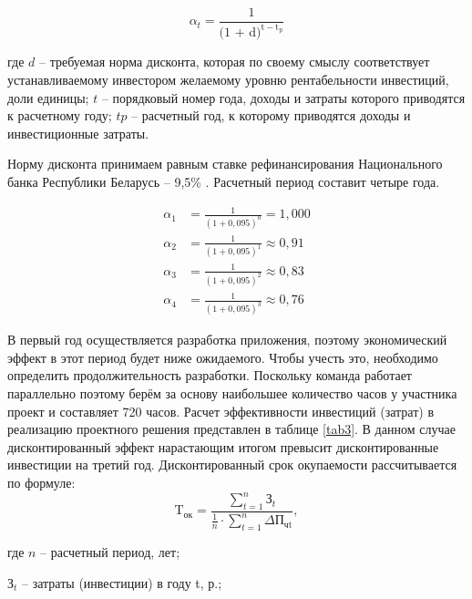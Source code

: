 \begin{equation}
\alpha_t = \frac{1}{\text{(1 + d)}^{\text{t}-\text{t}_\text{p}}}
\end{equation}
\newpage

где $d$ – требуемая норма дисконта, которая по своему смыслу соответствует устанавливаемому инвестором желаемому уровню рентабельности инвестиций, доли единицы;
$t$  – порядковый номер года, доходы и затраты которого приводятся к расчетному году;
$tp$  – расчетный год, к которому приводятся доходы и инвестиционные затраты.

Норму дисконта принимаем равным ставке рефинансирования Национального банка Республики Беларусь – 9,5\% \cite{refr}. Расчетный период составит четыре года.

\begin{equation}
	\begin{aligned}
		\alpha_1 & = \frac{1}{(1 + 0{,}095)^0} = 1{,}000      \\
		\alpha_2 & = \frac{1}{(1 + 0{,}095)^1} \approx 0{,}91 \\
		\alpha_3 & = \frac{1}{(1 + 0{,}095)^2} \approx 0{,}83 \\
		\alpha_4 & = \frac{1}{(1 + 0{,}095)^3} \approx 0{,}76
	\end{aligned}
\end{equation}

В первый год осуществляется разработка приложения, поэтому экономический эффект в этот период будет ниже ожидаемого.
Чтобы учесть это, необходимо определить продолжительность разработки. Поскольку команда работает параллельно поэтому берём за основу наибольшее количество часов у участника
проект и составляет 720 часов. Расчет эффективности инвестиций (затрат) в реализацию проектного решения представлен в таблице \ref{tab3}.
В данном случае дисконтированный эффект нарастающим итогом превысит дисконтированные инвестиции на третий год. Дисконтированный срок окупаемости рассчитывается по формуле:
\begin{equation}
\text{T}_{\text{ок}} = \frac{\sum_{t=1}^{n}{\text{З}_t}}{\frac{1}{n} \cdot \sum_{t=1}^{n} \Delta\text{П}_{\text{чt}}},
\end{equation}

где $n$ – расчетный период, лет;

$\text{З}_t$ – затраты (инвестиции) в году t, р.;

